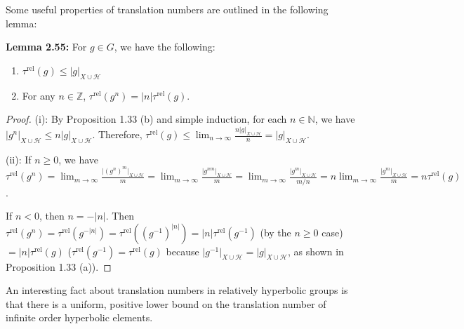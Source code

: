 \documentclass[12pt]{article}
\newcommand{\vs}{\vskip10pt}
\begin{document}
	\vs 
	
	Some useful properties of translation numbers are outlined in the following lemma: 
	
	\vs 
	
	\textbf{Lemma 2.55: } For $g \in G$, we have the following: 
	
	\begin{enumerate} [label = (\roman*)]
		\item $\tau^{\text{rel}}(g) \leq \vert g \vert_{X \cup \mathcal{H}}$
		\item For any $n \in \mathbb{Z}$, $\tau^{\text{rel}}(g^n) = \vert n \vert \tau^{\text{rel}}(g)$.
	\end{enumerate}

	\begin{proof}
		
	(i): By Proposition 1.33 (b) and simple induction, for each $n \in \mathbb{N}$, we have $\vert g^n \vert_{X \cup \mathcal{H}} \leq n \vert g \vert_{X \cup \mathcal{H}}$. Therefore, $\tau^{\text{rel}}(g) \leq \lim_{n \rightarrow \infty} \frac{n \vert g \vert_{X \cup \mathcal{H}}}{n} = \vert g \vert_{X \cup \mathcal{H}}$. 
	
	\vs 
	
	(ii): If $n \geq 0$, we have $\tau^{\text{rel}}(g^n) = \lim_{m \rightarrow \infty} \frac{\vert (g^{n})^m \vert_{X \cup \mathcal{H}}}{m} = \lim_{m \rightarrow \infty} \frac{\vert g^{nm} \vert_{X \cup \mathcal{H}}}{m} = \lim_{m \rightarrow \infty} \frac{\vert g^{m} \vert_{X \cup \mathcal{H}}}{m/n} = n \lim_{m \rightarrow \infty} \frac{\vert g^{m} \vert_{X \cup \mathcal{H}}}{m} = n \tau^{\text{rel}}(g)$.
	
	\vs 
	
	If $n < 0$, then $n = -\vert n \vert$. Then $\tau^{\text{rel}}(g^n) = \tau^{\text{rel}}(g^{-\vert n \vert}) = \tau^{\text{rel}}((g^{-1})^{\vert n \vert}) = \vert n \vert \tau^{\text{rel}}(g^{-1})$ (by the $n \geq 0$ case) $= \vert n \vert \tau^{\text{rel}}(g)$ ($\tau^{\text{rel}}(g^{-1}) = \tau^{\text{rel}}(g)$ because $\vert g^{-1} \vert_{X \cup \mathcal{H}} = \vert g \vert_{X \cup \mathcal{H}}$, as shown in Proposition 1.33 (a)). 
		
	\end{proof}
	
	\vs 
	
	An interesting fact about translation numbers in relatively hyperbolic groups is that there is a uniform, positive lower bound on the translation number of infinite order hyperbolic elements. 
	
\end{document}
